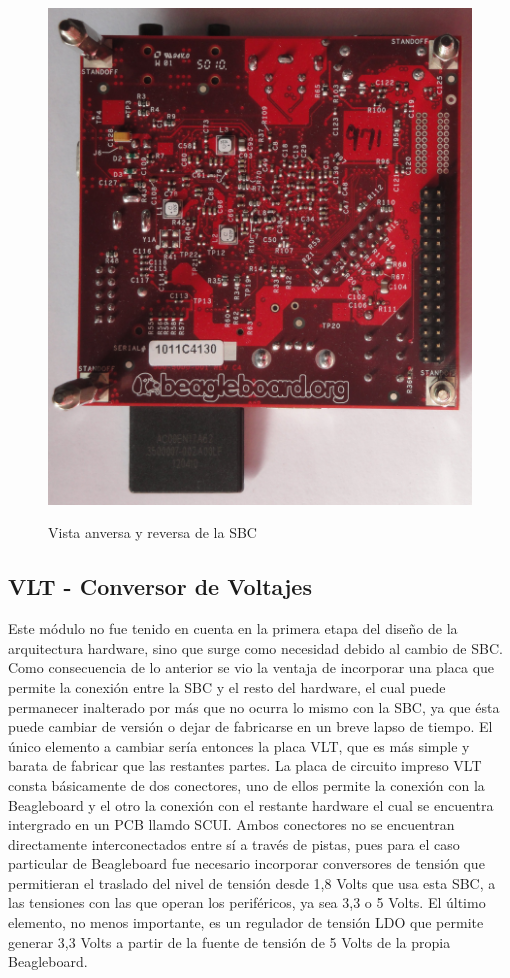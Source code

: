 \begin{figure}[H]
{  \includegraphics[scale=.08 ]{Imagenes/SBC_b.jpg} }

  \caption{Vista anversa y reversa de la SBC}\label{sbcFB}
\end{figure}


\subsection{VLT - Conversor de Voltajes}
Este módulo no fue tenido en cuenta en la primera etapa del diseño de la arquitectura hardware, sino que surge como necesidad debido al cambio de SBC. Como consecuencia de lo anterior se vio la ventaja de incorporar una placa que permite la conexión entre la SBC y el resto del hardware, el cual puede permanecer inalterado por más que no ocurra lo mismo con la SBC, ya que ésta puede cambiar de versión o dejar de fabricarse en un breve lapso de tiempo. El único elemento a cambiar sería entonces la placa VLT, que es más simple y barata de fabricar que las restantes partes.
La placa de circuito impreso VLT consta básicamente de dos conectores, uno de ellos permite la conexión con la Beagleboard y el otro la conexión con el restante hardware el cual se encuentra intergrado en un PCB llamdo SCUI. Ambos conectores no se encuentran directamente interconectados entre sí a través de pistas, pues para el caso particular de Beagleboard fue necesario incorporar conversores de tensión que permitieran el traslado del nivel de tensión desde 1,8 Volts que usa esta SBC, a las tensiones con las que operan los periféricos, ya sea 3,3 o 5 Volts.
El último elemento, no menos importante, es un regulador de tensión LDO que permite generar 3,3 Volts a partir de la fuente de tensión de 5 Volts de la propia Beagleboard.

